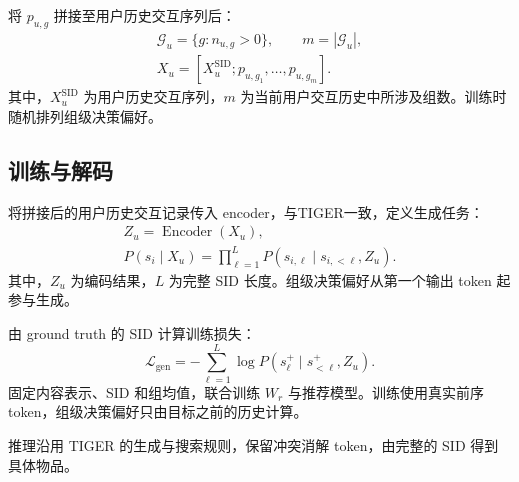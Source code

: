 \documentclass[UTF8,11pt,a4paper]{ctexart}
\begin{document}
将 $p_{u,g}$ 拼接至用户历史交互序列后：
\begin{gather}
 \mathcal G_u=\{g:n_{u,g}>0\},\qquad m=|\mathcal G_u|,\\
 X_u=[X_u^{\mathrm{SID}};p_{u,g_1},\ldots,p_{u,g_m}].
\end{gather}
其中，$X_u^{\mathrm{SID}}$ 为用户历史交互序列，$m$ 为当前用户交互历史中所涉及组数。训练时随机排列组级决策偏好。

\subsection{训练与解码}

将拼接后的用户历史交互记录传入 encoder，与TIGER一致，定义生成任务：
\begin{gather}
 Z_u=\operatorname{Encoder}(X_u),\\
 P(s_i\mid X_u)=\prod_{\ell=1}^{L}
 P(s_{i,\ell}\mid s_{i,<\ell},Z_u).
\end{gather}
其中，$Z_u$ 为编码结果，$L$ 为完整 SID 长度。组级决策偏好从第一个输出 token 起参与生成。

由 ground truth 的 SID 计算训练损失：
\begin{equation}
 \mathcal L_{\mathrm{gen}}=-\sum_{\ell=1}^{L}
 \log P(s^+_\ell\mid s^+_{<\ell},Z_u).
\end{equation}
固定内容表示、SID 和组均值，联合训练 $W_r$ 与推荐模型。训练使用真实前序 token，组级决策偏好只由目标之前的历史计算。

推理沿用 TIGER 的生成与搜索规则，保留冲突消解 token，由完整的 SID 得到具体物品。
\end{document}
